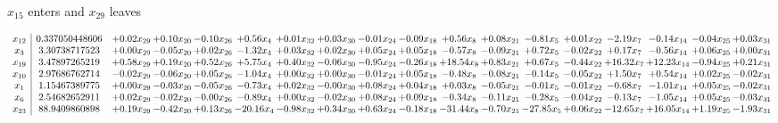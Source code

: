\documentclass[9pt]{article}
\begin{document}
 $ x_{15} $ enters and $ x_{29} $ leaves 

 \[\begin{array}{c| c c@{\hskip 2pt} c@{\hskip 2pt} c@{\hskip 2pt} c@{\hskip 2pt} c@{\hskip 2pt} c@{\hskip 2pt} c@{\hskip 2pt} c@{\hskip 2pt} c@{\hskip 2pt} c@{\hskip 2pt} c@{\hskip 2pt} c@{\hskip 2pt} c@{\hskip 2pt} c@{\hskip 2pt} c@{\hskip 2pt} c@{\hskip 2pt} }
 x_{12}   &  0.337050448606 & +  0.02 x_{29} & +  0.10 x_{20} & -0.10 x_{26} & +  0.56 x_{4} & +  0.01 x_{32} & +  0.03 x_{30} & -0.01 x_{24} & -0.09 x_{18} & +  0.56 x_{8} & +  0.08 x_{21} & -0.81 x_{5} & +  0.01 x_{22} & -2.19 x_{7} & -0.14 x_{14} & -0.04 x_{25} & +  0.03 x_{31}\\
 x_{3}   &  3.30738717523 & +  0.00 x_{29} & -0.05 x_{20} & +  0.02 x_{26} & -1.32 x_{4} & +  0.03 x_{32} & +  0.02 x_{30} & +  0.05 x_{24} & +  0.05 x_{18} & -0.57 x_{8} & -0.09 x_{21} & +  0.72 x_{5} & -0.02 x_{22} & +  0.17 x_{7} & -0.56 x_{14} & +  0.06 x_{25} & +  0.00 x_{31}\\
 x_{19}   &  3.47897265219 & +  0.58 x_{29} & +  0.19 x_{20} & +  0.52 x_{26} & +  5.75 x_{4} & +  0.40 x_{32} & -0.06 x_{30} & -0.95 x_{24} & -0.26 x_{18} & + 18.54 x_{8} & +  0.83 x_{21} & +  0.67 x_{5} & -0.44 x_{22} & + 16.32 x_{7} & + 12.23 x_{14} & -0.94 x_{25} & +  0.21 x_{31}\\
 x_{10}   &  2.97686762714 & -0.02 x_{29} & -0.06 x_{20} & +  0.05 x_{26} & -1.04 x_{4} & +  0.00 x_{32} & +  0.00 x_{30} & -0.01 x_{24} & +  0.05 x_{18} & -0.48 x_{8} & -0.08 x_{21} & -0.14 x_{5} & -0.05 x_{22} & +  1.50 x_{7} & +  0.54 x_{14} & +  0.02 x_{25} & -0.02 x_{31}\\
 x_{1}   &  1.15467389775 & +  0.00 x_{29} & -0.03 x_{20} & -0.05 x_{26} & -0.73 x_{4} & +  0.02 x_{32} & -0.00 x_{30} & +  0.08 x_{24} & +  0.04 x_{18} & +  0.03 x_{8} & -0.05 x_{21} & -0.01 x_{5} & -0.01 x_{22} & -0.68 x_{7} & -1.01 x_{14} & +  0.05 x_{25} & -0.02 x_{31}\\
 x_{6}   &  2.54682652911 & +  0.02 x_{29} & -0.02 x_{20} & -0.00 x_{26} & -0.89 x_{4} & +  0.00 x_{32} & -0.02 x_{30} & +  0.08 x_{24} & +  0.09 x_{18} & -0.34 x_{8} & -0.11 x_{21} & -0.28 x_{5} & -0.04 x_{22} & -0.13 x_{7} & -1.05 x_{14} & +  0.05 x_{25} & -0.03 x_{31}\\
 x_{23}   &  88.9409860898 & +  0.19 x_{29} & -0.42 x_{20} & +  0.13 x_{26} & -20.16 x_{4} & -0.98 x_{32} & +  0.34 x_{30} & +  0.63 x_{24} & -0.18 x_{18} & -31.44 x_{8} & -0.70 x_{21} & -27.85 x_{5} & +  0.06 x_{22} & -12.65 x_{7} & + 16.05 x_{14} & +  1.19 x_{25} & -1.93 x_{31}\\

\end{array}\]
\end{document}

